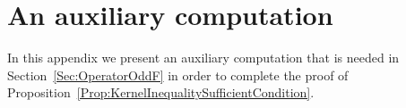%
%
%


\section{An auxiliary computation}
\label{Sec:AuxiliaryResults2}

In this appendix we present an auxiliary computation that is needed in Section~\ref{Sec:OperatorOddF} in order to complete the proof of Proposition~\ref{Prop:KernelInequalitySufficientCondition}.

